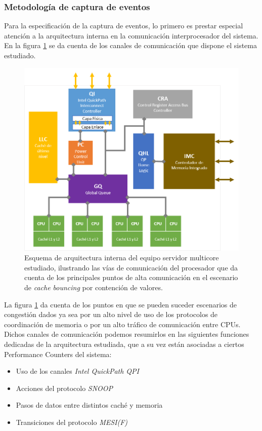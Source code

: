 \subsubsection{Metodología de captura de eventos}
Para la especificación de la captura de eventos, lo primero es prestar especial atención a la arquitectura interna en la comunicación interprocesador del sistema. En la figura \ref{fig:hwcomm} se da cuenta de los canales de comunicación que dispone el sistema estudiado.

\begin{figure}[!h]
	\centering
	\includegraphics[scale=.8]{imagenes/QuickPathChannels.png}
	\caption{Esquema de arquitectura interna del equipo servidor multicore estudiado, ilustrando las vías de comunicación del procesador que da cuenta de los principales puntos de alta comunicación en el escenario de \textit{cache bouncing} por contención de valores.}
	\label{fig:hwcomm}
\end{figure}

La figura \ref{fig:hwcomm} da cuenta de los puntos en que se pueden suceder escenarios de congestión dados ya sea por un alto nivel de uso de los protocolos de coordinación de memoria o por un alto tráfico de comunicación entre CPUs. Dichos canales de comunicación podemos resumirlos en las siguientes funciones dedicadas de la arquitectura estudiada, que a su vez están asociadas a ciertos Performance Counters del sistema:

\begin{itemize}
\item Uso de los canales \emph{Intel QuickPath QPI}
\item Acciones del protocolo \emph{SNOOP}
\item Pasos de datos entre distintos caché y memoria
\item Transiciones del protocolo \emph{MESI(F)}
\end{itemize}


